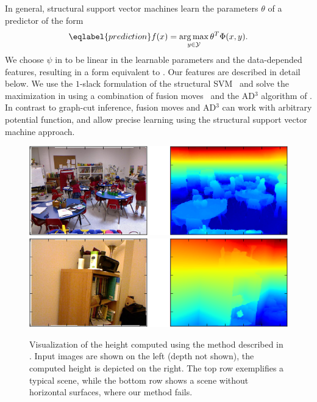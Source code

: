 \documentclass[a4paper, 10pt, conference]{ieeeconf}      %
\DeclareMathOperator*{\argmax}{arg\,max}
\begin{document}
In general, structural support vector machines learn the parameters $\theta$ of a predictor of the form
\begin{equation}\eqlabel{prediction}
f(x) = \argmax_{y \in \mathcal{Y}} \theta^T \Phi(x, y).
\end{equation}
We choose $\psi$ in  to be linear in the learnable parameters and
the data-depended features, resulting in a form equivalent to
. Our features are described in detail below.  We use the
$1$-slack formulation of the structural SVM~\citep{joachims2009cutting} and
solve the maximization in  using a combination of fusion
moves~\citep{lempitsky2010fusion} and the AD$^3$ algorithm of
\citet{martins2011augmented}.  In contrast to graph-cut inference, fusion moves
and AD$^3$ can work with arbitrary potential function, and allow precise
learning using the structural support vector machine approach.

\begin{figure}
    \begin{center}
        \includegraphics[width=\linewidth]{images/height_success}\\
        \vspace{3mm}
        \includegraphics[width=\linewidth]{images/height_failure}
    \end{center}
    \caption{%
        Visualization of the height computed using the method described in .
        Input images are shown on the left (depth not shown), the computed height is depicted on the right.
        The top row exemplifies a typical scene, while the bottom row shows a scene without horizontal
        surfaces, where our method fails.
    }
\end{figure}
\end{document}
